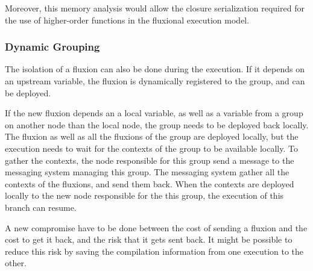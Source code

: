 Moreover, this memory analysis would allow the closure serialization required for the use of higher-order functions in the fluxional execution model.

\subsubsection{Dynamic Grouping}

The isolation of a fluxion can also be done during the execution.
If it depends on an upstream variable, the fluxion is dynamically registered to the group, and can be deployed.

If the new fluxion depends an a local variable, as well as a variable from a group on another node than the local node, the group needs to be deployed back locally.
The fluxion as well as all the fluxions of the group are deployed locally, but the execution needs to wait for the contexts of the group to be available locally.
To gather the contexts, the node responsible for this group send a message to the messaging system managing this group.
The messaging system gather all the contexts of the fluxions, and send them back.
When the contexts are deployed locally to the new node responsible for the this group, the execution of this branch can resume.

A new compromise have to be done between the cost of sending a fluxion and the cost to get it back, and the risk that it gets sent back.
It might be possible to reduce this risk by saving the compilation information from one execution to the other.


